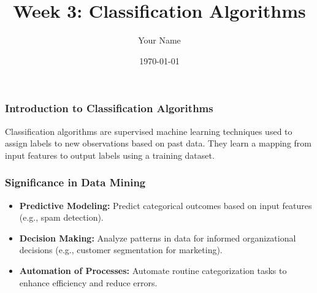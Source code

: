 \documentclass{beamer}
\title{Week 3: Classification Algorithms}
\author{Your Name}
\institute{Your Institution}
\date{\today}
\begin{document}
\frame{\titlepage}

\begin{frame}[fragile]
    \frametitle{Introduction to Classification Algorithms}
    Classification algorithms are supervised machine learning techniques used to assign labels to new observations based on past data. They learn a mapping from input features to output labels using a training dataset.
\end{frame}

\begin{frame}[fragile]
    \frametitle{Significance in Data Mining}
    \begin{itemize}
        \item \textbf{Predictive Modeling:} Predict categorical outcomes based on input features (e.g., spam detection).
        \item \textbf{Decision Making:} Analyze patterns in data for informed organizational decisions (e.g., customer segmentation for marketing).
        \item \textbf{Automation of Processes:} Automate routine categorization tasks to enhance efficiency and reduce errors.
    \end{itemize}
\end{frame}
\end{document}
